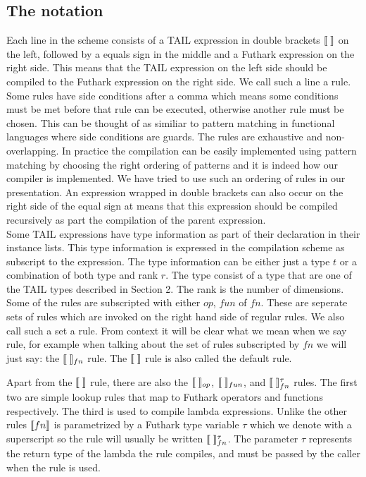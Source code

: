 \documentclass[11pt]{article}
\begin{document}
\subsection{The notation}
Each line in the scheme consists of a TAIL expression in double brackets $\llbracket \; \rrbracket$ on the left, followed by a
equals sign in the middle and a Futhark expression on the right side. This means that the TAIL expression on the left
side should be compiled to the Futhark expression on the right side. We call such a line a rule. Some rules have side
conditions after a comma which means some conditions must be met before that rule can be executed, otherwise another
rule must be chosen. This can be thought of as similiar to pattern matching in functional languages where side conditions
are guards. The rules are exhaustive and non-overlapping.
In practice the compilation can be easily implemented using pattern matching by choosing the right ordering of patterns
and it is indeed how our compiler is implemented.
We have tried to use such an ordering of rules in our presentation.
An expression wrapped in double brackets can also occur on the right side of the equal sign at means that this expression
should be compiled recursively as part the compilation of the parent expression.\\

Some TAIL expressions have type information as part of their declaration in their instance lists.
This type information is expressed in the compilation scheme as subscript to the expression.
The type information can be either just a type $t$ or a combination of both type and rank $r$.
The type consist of a type that are one of the TAIL types described in Section 2. The rank is the number of dimensions.  \\

Some of the rules are subscripted with either $op$, $fun$ of $fn$.
These are seperate sets of rules which are invoked on the right hand side of regular rules.
We also call such a set a rule.
From context it will be clear what we mean when we say rule, for example when talking about the set of rules subscripted by
$fn$ we will just say: the $\llbracket \; \rrbracket_{fn}$ rule. The $\llbracket \; \rrbracket$ rule is also called the default rule.

Apart from the $\llbracket \; \rrbracket$ rule, there are also the $\llbracket \; \rrbracket_{op}$, $\llbracket \; \rrbracket_{fun}$,  and $\llbracket \; \rrbracket_{fn}^{\tau}$ rules.
The first two are simple lookup rules that map to Futhark operators and functions respectively.
The third is used to compile lambda expressions.
Unlike the other rules $\llbracket fn \rrbracket$ is parametrized by a Futhark type variable $\tau$ which we denote with a superscript
so the rule will usually be written $\llbracket \; \rrbracket_{fn}^{\tau}$.
The parameter $\tau$ represents the return type of the lambda the rule compiles,
and must be passed by the caller when the rule is used.
\end{document}
